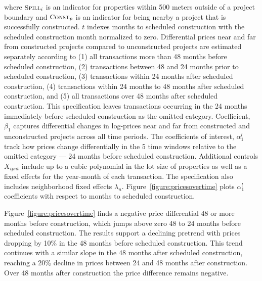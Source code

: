 \documentclass[12pt]{article}
\begin{document}
\noindent where $\textsc{\small Spill}_{i}$ is an indicator for properties within 500 meters outside of a project boundary and $\textsc{\small Const}_{p}$ is an indicator for being nearby a project that is successfully constructed.  $t$ indexes months to scheduled construction with the scheduled construction month normalized to zero.  Differential prices near and far from constructed projects compared to unconstructed projects are estimated separately according to (1) all transactions more than 48 months before scheduled construction, (2) transactions between 48 and 24 months prior to scheduled construction, (3) transactions within 24 months after scheduled construction, (4) transactions within 24 months to 48 months after scheduled construction, and (5) all transactions over 48 months after scheduled construction.  This specification leaves transactions occurring in the 24 months immediately before scheduled construction as the omitted category.  Coefficient, $\beta_1$ captures differential changes in log-prices near and far from constructed and unconstructed projects across all time periods.  The coefficients of interest, $\alpha_1^{l}$ track how prices change differentially in the 5 time windows relative to the omitted category --- 24 months before scheduled construction.  Additional controls $X_{ipnt}$ include up to a cubic polynomial in the lot size of properties as well as a fixed effects for the year-month of each transaction.  The specification also includes neighborhood fixed effects $\lambda_n$.  Figure~\ref{figure:pricesovertime} plots $\alpha_1^{l}$ coefficients with respect to months to scheduled construction.

Figure~\ref{figure:pricesovertime} finds a negative price differential 48 or more months before construction, which jumps above zero 48 to 24 months before scheduled construction.   The results support a declining pretrend with prices dropping by 10\% in the 48 months before scheduled construction.  This trend continues with a similar slope in the 48 months after scheduled construction, reaching a 20\% decline in prices between 24 and 48 months after construction.  Over 48 months after construction the price difference remains negative.  
\end{document}
